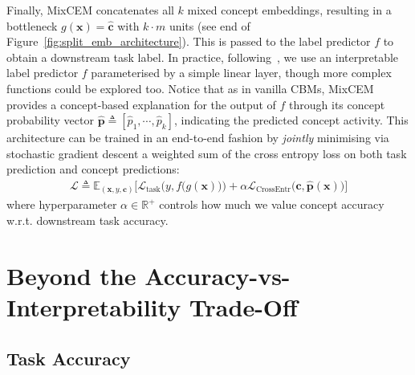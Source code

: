 Finally, MixCEM concatenates all $k$ mixed concept embeddings, resulting in a bottleneck $g(\mathbf{x}) = \hat{\textbf{c}}$ with $k\cdot m$ units (see end of Figure~\ref{fig:split_emb_architecture}). This is passed to the label predictor $f$ to obtain a downstream task label. In practice, following~\citet{koh2020concept}, we use an interpretable label predictor $f$ parameterised by a simple linear layer, though more complex functions could be explored too. Notice that as in vanilla CBMs, MixCEM provides a concept-based explanation for the output of $f$ through its concept probability vector $\hat{\mathbf{p}} \triangleq [\hat{p}_1, \cdots, \hat{p}_k ]$, indicating the predicted concept activity. This architecture can be trained in an end-to-end fashion by \textit{jointly} minimising via stochastic gradient descent a weighted sum of the cross entropy loss on both task prediction and concept predictions:
\begin{align}
    \mathcal{L} \triangleq \mathbb{E}_{(\mathbf{x}, y, \mathbf{c})}\Big[ \mathcal{L}_\text{task}\Big(y, f\big(g(\mathbf{x})\big)\Big) + \alpha \mathcal{L}_\text{CrossEntr}\Big(\mathbf{c}, \hat{\mathbf{p}}(\mathbf{x})\Big) \Big]
\end{align}
where hyperparameter $\alpha \in \mathbb{R}^+$ controls how much we value concept accuracy w.r.t. downstream task accuracy. 


\section{Beyond the Accuracy-vs-Interpretability Trade-Off}
\subsection{Task Accuracy}

